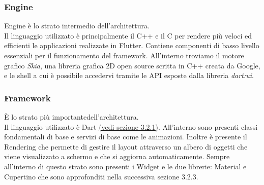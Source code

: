 \subsubsection{Engine}
Engine è lo strato intermedio dell'architettura.\\
Il linguaggio utilizzato è principalmente il C++ e il C per rendere più veloci ed efficienti le applicazioni realizzate in Flutter.
Contiene componenti di basso livello essenziali per il funzionamento del framework.
All'interno troviamo il motore grafico \textit{Skia}, una libreria grafica 2D open source scritta in C++ creata da Google, e le shell a cui è possibile accedervi tramite le API esposte dalla libreria \textit{dart:ui}.

\subsubsection{Framework}
È lo strato più importantedell'architettura.\\
Il linguaggio utilizzato è Dart \hyperref[sec:Dart]{(vedi sezione 3.2.1)}.
All'interno sono presenti classi fondamentali di base e servizi di base come le animazioni.
Inoltre è presente il Rendering che permette di gestire il layout attraverso un albero di oggetti che viene visualizzato
a schermo e che si aggiorna automaticamente.
Sempre all'interno di questo strato sono presenti i Widget e le due librerie: Material e Cupertino che sono approfonditi nella successiva sezione 3.2.3.

\newpage

